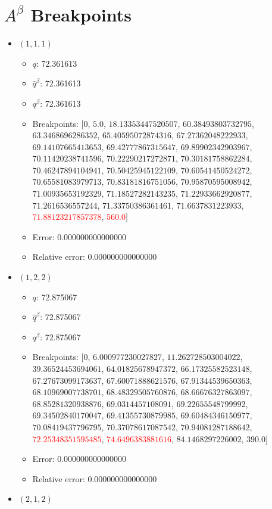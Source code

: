 \documentclass{article}%
\begin{document}
\section{$A^\beta$ Breakpoints}%
\thispagestyle{plain}%
\begin{itemize}%
	\item $(1, 1, 1)$%
	\begin{itemize}%
		\item $q$: 72.361613%
		\item $\hat{q}^\beta$: 72.361613%
		\item $q^\beta$: 72.361613%
		\item Breakpoints: $[$$0$, $5.0$, $18.13353447520507$, $60.38493803732795$, $63.3468696286352$, $65.40595072874316$, $67.27362048222933$, $69.14107665413653$, $69.42777867315647$, $69.89902342903967$, $70.11420238741596$, $70.22290217272871$, $70.30181758862284$, $70.46247894104941$, $70.50425945122109$, $70.60541450524272$, $70.65581083979713$, $70.83181816751056$, $70.95870595008942$, $71.00935653192329$, $71.18527282143235$, $71.22933662920877$, $71.2616536557244$, $71.33750386361461$, $71.6637831223933$, \textcolor{red}{$71.88123217857378$}, \textcolor{red}{$560.0$}$]$%
		\item Error: 0.000000000000000%
		\item Relative error: 0.000000000000000%
	\end{itemize}%
	\item $(1, 2, 2)$%
	\begin{itemize}%
		\item $q$: 72.875067%
		\item $\hat{q}^\beta$: 72.875067%
		\item $q^\beta$: 72.875067%
		\item Breakpoints: $[$$0$, $6.000977230027827$, $11.262728503004022$, $39.36524453694061$, $64.01825678947372$, $66.17325582523148$, $67.27673099173637$, $67.60071888621576$, $67.91344539650363$, $68.10969007738701$, $68.48329505760876$, $68.66676327863097$, $68.85281320938876$, $69.0314457108091$, $69.22655548799992$, $69.34502840170047$, $69.41355730879985$, $69.60484346150977$, $70.08419437796795$, $70.37078617087542$, $70.94081287188642$, \textcolor{red}{$72.25348351595485$}, \textcolor{red}{$74.6496383881616$}, $84.1468297226002$, $390.0$$]$%
		\item Error: 0.000000000000000%
		\item Relative error: 0.000000000000000%
	\end{itemize}%
	\item $(2, 1, 2)$%

\end{itemize}
\end{document}
